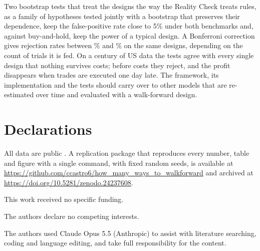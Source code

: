 \documentclass[pdflatex,sn-basic]{sn-jnl}
\theoremstyle{thmstyleone}
\theoremstyle{thmstylethree}
\begin{document}
Two bootstrap tests that treat the designs the way the Reality Check treats rules, as a family of
hypotheses tested jointly with a bootstrap that preserves their dependence, keep the false-positive rate
close to 5\% under both benchmarks and, against buy-and-hold, keep the power of a typical design. A
Bonferroni correction gives rejection rates between \NumSizeBonf\% and \NumSizeBonfEff\% on the same
designs, depending on the count of trials it is fed. On a century of US data the tests agree with every
single design that nothing survives costs; before costs they reject, and the profit disappears when
trades are executed one day late. The framework, its implementation and the tests should carry over to
other models that are re-estimated over time and evaluated with a walk-forward design.

\backmatter

\section*{Declarations}

 All data are public \citep{french2026,fred2026}. A replication
package that reproduces every number, table and figure with a single command, with fixed random seeds, is
available at \url{https://github.com/ccastro6/how_many_ways_to_walkforward} and archived at
\url{https://doi.org/10.5281/zenodo.24237608}.

 This work received no specific funding.

 The authors declare no competing interests.

 The authors used Claude Opus 5.5 (Anthropic) to assist with literature
searching, coding and language editing, and take full responsibility for the content.
\end{document}
